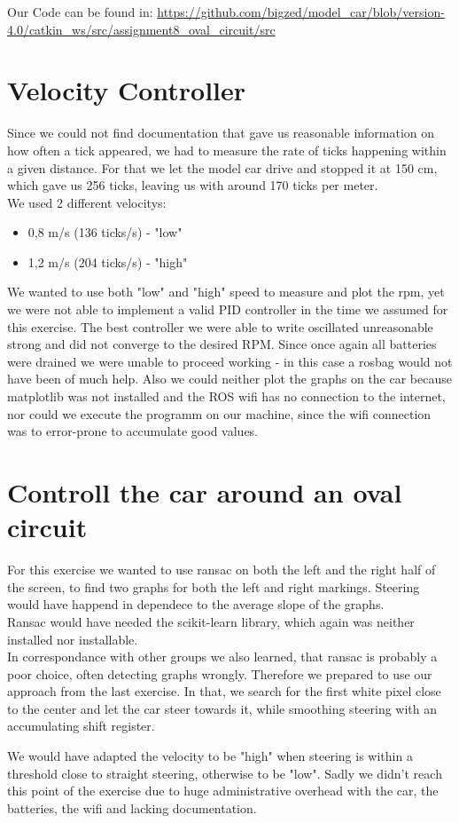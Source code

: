 \documentclass[10pt,oneside,a4paper]{article}
\begin{document}
    Our Code can be found in:
    \url{https://github.com/bigzed/model_car/blob/version-4.0/catkin_ws/src/assignment8_oval_circuit/src}
    \section{Velocity Controller}
        Since we could not find documentation that gave us reasonable
        information on how often a tick appeared, we had to measure the rate of
        ticks happening within a given distance. For that we let the model car drive
        and stopped it at 150 cm, which gave us 256 ticks, leaving us with
        around 170 ticks per meter.\\
        We used 2 different velocitys:
        \begin{itemize}
            \item 0,8 m/s (136 ticks/s) - "{}low"{}
            \item 1,2 m/s (204 ticks/s) - "{}high"{}
        \end{itemize}

        We wanted to use both "{}low"{} and "{}high"{} speed to measure and plot
        the rpm, yet we were not able to implement a valid PID controller in the
        time we assumed for this exercise.
        The best controller we were able to write oscillated
		unreasonable strong and did not converge to the desired RPM.
        Since once again all batteries were drained we were unable to proceed
        working - in this case a rosbag would not have been of much help.
        Also we could neither plot the graphs on the car because matplotlib
        was not installed and the ROS wifi has no connection to the internet,
        nor could we execute the programm on our machine, since the wifi connection
        was to error-prone to accumulate good values.
    \section{Controll the car around an oval circuit}
        For this exercise we wanted to use ransac on both the left and the right
        half of the screen, to find two graphs for both the left and right markings.
        Steering would have happend in dependece to the average slope of the graphs.\\
        Ransac would have needed the scikit-learn library, which again was
        neither installed nor installable.\\
        In correspondance with other groups we also learned, that ransac is
        probably a poor choice, often detecting graphs wrongly.
        Therefore we prepared to use our approach from the last exercise.
        In that, we search for the first white pixel close to the center
        and let the car steer towards it, while smoothing steering with an
        accumulating shift register.
        
        We would have adapted the velocity to be "{}high"{} when steering is within a
        threshold close to straight steering, otherwise to be "{}low"{}.
        Sadly we didn't reach this point of the exercise due to huge administrative
        overhead with the car, the batteries, the wifi and lacking documentation.
\end{document}
